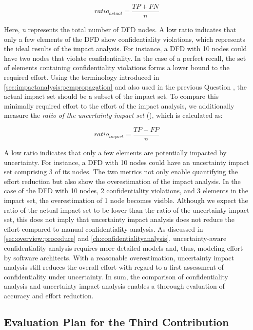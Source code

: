 \begin{equation*}
  ratio_{actual} = \frac{TP + FN}{n}
\end{equation*}

Here, \emph{n} represents the total number of \ac{DFD} nodes.
A low ratio indicates that only a few elements of the \ac{DFD} show confidentiality violations, which represents the ideal results of the impact analysis.
For instance, a \ac{DFD} with 10 nodes could have two nodes that violate confidentiality.
In the case of a perfect recall, the set of elements containing confidentiality violations forms a lower bound to the required effort.
Using the terminology introduced in \autoref{sec:impactanalysis:pcmpropagation} and also used in the previous Question , the actual impact set should be a subset of the impact set.
To compare this minimally required effort to the effort of the impact analysis, we additionally measure the \emph{ratio of the uncertainty impact set} (\label{gqm:text:m:6:1:2}), which is calculated as:

\begin{equation*}
  ratio_{impact} = \frac{TP + FP}{n}
\end{equation*}

A low ratio indicates that only a few elements are potentially impacted by uncertainty.
For instance, a \ac{DFD} with 10 nodes could have an uncertainty impact set comprising 3 of its nodes.
The two metrics not only enable quantifying the effort reduction but also show the overestimation of the impact analysis.
In the case of the \ac{DFD} with 10 nodes, 2 confidentiality violations, and 3 elements in the impact set, the overestimation of 1 node becomes visible.
Although we expect the ratio of the actual impact set to be lower than the ratio of the uncertainty impact set, this does not imply that uncertainty impact analysis does not reduce the effort compared to manual confidentiality analysis.
As discussed in \autoref{sec:overview:procedure} and \autoref{ch:confidentialityanalysis}, uncertainty-aware confidentiality analysis requires more detailed models and, thus, modeling effort by software architects.
With a reasonable overestimation, uncertainty impact analysis still reduces the overall effort with regard to a first assessment of confidentiality under uncertainty.
In sum, the comparison of confidentiality analysis and uncertainty impact analysis enables a thorough evaluation of accuracy and effort reduction.


\subsection{Evaluation Plan for the Third Contribution}

